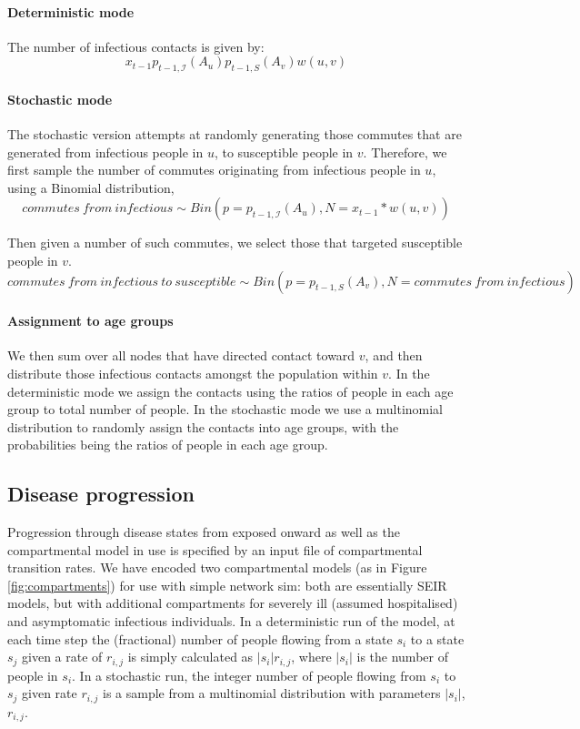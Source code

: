 \documentclass[11pt]{article}
\begin{document}
\paragraph{Deterministic mode}\hfill \break
The number of infectious contacts is given by:
$$x_{t-1} p_{t-1, \mathcal{I}}(A_u) p_{t-1, S}(A_v) w(u, v)$$

\paragraph{Stochastic mode}\hfill \break
The stochastic version attempts at randomly generating those commutes that are generated from infectious people in $u$, to susceptible people in $v$. Therefore, we first sample the number of commutes originating from infectious people in $u$, using a Binomial distribution, 
$$commutes \ from \ infectious \sim Bin(p=p_{t-1, \mathcal{I}}(A_u), N=x_{t-1} * w(u, v))$$

Then given a number of such commutes, we select those that targeted susceptible people in $v$.
$$commutes \ from \ infectious \ to \ susceptible \sim Bin(p=p_{t-1, S}(A_v), N=commutes \ from \ infectious)$$

\paragraph{Assignment to age groups}\hfill \break
We then sum over all nodes that have directed contact toward $v$, and then distribute those infectious contacts amongst the population within $v$. In the deterministic mode we assign the contacts using the ratios of people in each age group to total number of people. In the stochastic mode we use a multinomial distribution to randomly assign the contacts into age groups, with the probabilities being the ratios of people in each age group.

\subsection{Disease progression}
Progression through disease states from exposed onward as well as the compartmental model in use is specified by an input file of compartmental transition rates. We have encoded two compartmental models (as in Figure \ref{fig:compartments}) for use with simple network sim: both are essentially SEIR models, but with additional compartments for severely ill (assumed hospitalised) and asymptomatic infectious individuals. In a deterministic run of the model, at each time step the (fractional) number of people flowing from a state $s_i$ to a state $s_j$ given a rate of $r_{i,j}$ is simply calculated as $|s_i|r_{i,j}$, where $|s_i|$ is the number of people in $s_i$.  In a stochastic run, the integer number of people flowing from $s_i$ to $s_j$ given rate $r_{i,j}$ is a sample from a multinomial distribution with parameters $|s_i|$, $r_{i,j}$.
\end{document}

